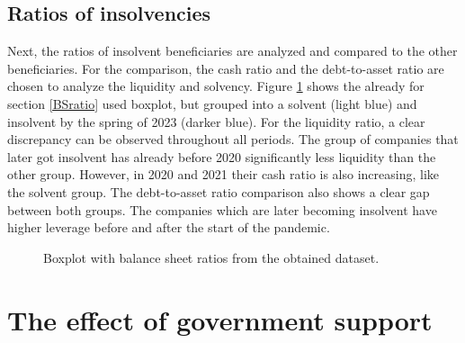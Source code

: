 \subsection{Ratios of insolvencies}

Next, the ratios of insolvent beneficiaries are analyzed and compared to the other beneficiaries. For the comparison, the cash ratio and the debt-to-asset ratio are chosen to analyze the liquidity and solvency. Figure \ref{fig:RatiosInsolvency} shows the already for section \ref{BSratio} used boxplot, but grouped into a solvent (light blue) and insolvent by the spring of 2023 (darker blue). For the liquidity ratio, a clear discrepancy can be observed throughout all periods. The group of companies that later got insolvent has already before 2020 significantly less liquidity than the other group. However, in 2020 and 2021 their cash ratio is also increasing, like the solvent group.
The debt-to-asset ratio comparison also shows a clear gap between both groups. The companies which are later becoming insolvent have higher leverage before and after the start of the pandemic. 

\begin{figure}
    \centering
    
    \decoRule
    \caption[Liquidity and solvency of insolvent beneficiaries]{Boxplot with balance sheet ratios from the obtained dataset.}
    \label{fig:RatiosInsolvency}
\end{figure}






\section{The effect of government support}



